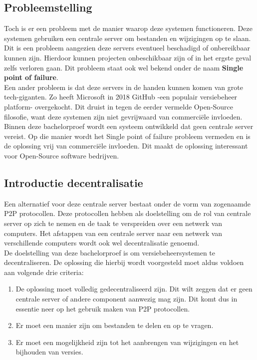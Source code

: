 \subsection{Probleemstelling}
Toch is er een probleem met de manier waarop deze systemen functioneren. Deze systemen gebruiken een centrale server om bestanden en wijzigingen op te slaan. Dit is een probleem aangezien deze servers eventueel beschadigd of onbereikbaar kunnen zijn. Hierdoor kunnen projecten onbeschikbaar zijn of in het ergste geval zelfs verloren gaan. Dit probleem staat ook wel bekend onder de naam \textbf{Single point of failure}.\\

Een ander probleem is dat deze servers in de handen kunnen komen van grote tech-giganten. Zo heeft Microsoft in 2018 GitHub -een populair versiebeheer platform- overgekocht. Dit druist in tegen de eerder vermelde Open-Source filosofie, want deze systemen zijn niet gevrijwaard van commerciële invloeden.\\

Binnen deze bachelorproef wordt een systeem ontwikkeld dat geen centrale server vereist. Op die manier wordt het Single point of failure probleem vermeden en is de oplossing vrij van commerciële invloeden. Dit maakt de oplossing interessant voor Open-Source software bedrijven.
\subsection{Introductie decentralisatie}
Een alternatief voor deze centrale server bestaat onder de vorm van zogenaamde P2P protocollen. Deze protocollen hebben als doelstelling om de rol van centrale server op zich te nemen en de taak te verspreiden over een netwerk van computers. Het afstappen van een centrale server naar een netwerk van verschillende computers wordt ook wel decentralisatie genoemd.\\

De doelstelling van deze bachelorproef is om versiebeheersystemen te  decentraliseren. De oplossing die hierbij wordt voorgesteld moet aldus voldoen aan volgende drie criteria:

\begin{enumerate}
 \item De oplossing moet volledig gedecentraliseerd zijn. Dit wilt zeggen dat er geen centrale server of andere component aanwezig mag zijn. Dit komt dus in essentie neer op het gebruik maken van P2P protocollen.\\
 \item Er moet een manier zijn om bestanden te delen en op te vragen.\\
 \item Er moet een mogelijkheid zijn tot het aanbrengen van wijzigingen en het bijhouden van versies.
\end{enumerate}

